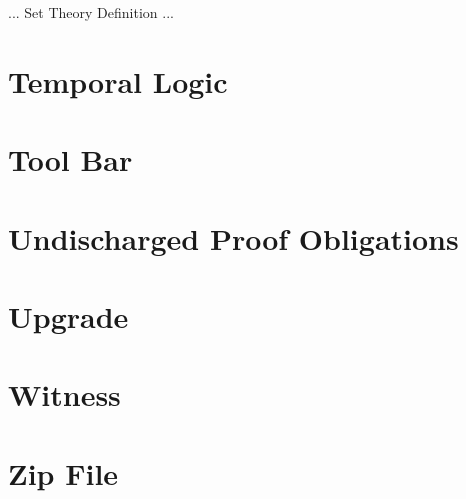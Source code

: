 ... Set Theory Definition ...

\section{Temporal Logic}
\label{temporal_logic}

\section{Tool Bar}
\label{tool_bar}

\section{Undischarged Proof Obligations}
\label{undischarged_proof_obligations}

\section{Upgrade}
\label{Upgrade}


\section{Witness}
\label{witness}

\section{Zip File}
\label{zip_file}


